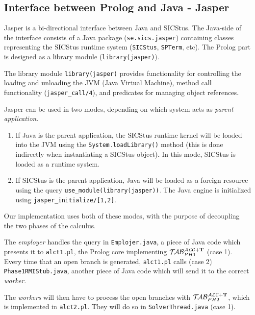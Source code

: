 \documentclass[a4paper, 11pt, oneside]{duthesis}
\newcommand{\tip}{{\bf T}}
\newcommand{\primo}{\mathrel{{\mathcal{T}\!\mathcal{AB}}}_{PH 1}^{\mathcal{ALC}+\mbox{\scriptsize $\tip$}}}
\newcommand{\secondo}{\mathrel{{\mathcal{T}\!\mathcal{AB}}}_{PH 2}^{\mathcal{ALC}+\mbox{\scriptsize $\tip$}}}
\begin{document}

\subsection{Interface between Prolog and Java - Jasper}\label{ssec_jasper}

Jasper is a bi-directional interface between Java and SICStus. The Java-side of the interface consists of a Java package (\verb$se.sics.jasper$) containing classes representing the SICStus runtime system (\verb$SICStus$, \verb$SPTerm$, etc). The Prolog part is designed as a library module (\verb$library(jasper)$).

The library module \verb$library(jasper)$  provides functionality for controlling the loading and unloading the JVM (Java Virtual Machine), method call functionality (\verb$jasper_call/4$), and predicates for managing object references.

Jasper can be used in two modes, depending on which system acts as \emph{parent application}.
\begin{enumerate}
\item If Java is the parent application, the SICStus runtime kernel will be loaded into the JVM using the \verb$System.loadLibrary()$ method (this is done indirectly when instantiating a SICStus object). In this mode, SICStus is loaded as a runtime system.

\item If SICStus is the parent application, Java will be loaded as a foreign resource using the query \verb$use_module(library(jasper))$. The Java engine is initialized using \verb$jasper_initialize/[1,2]$\cite{sicstus_jasper}.\\
\end{enumerate}

Our implementation uses both of these modes, with the purpose of decoupling the two phases of the calculus.

The \emph{employer} handles the query in \verb$Emplojer.java$, a piece of Java code which presents it to \verb$alct1.pl$, the Prolog core implementing $\primo$ (case 1). Every time that an open branch is generated, \verb$alct1.pl$ calls (case 2) \verb$Phase1RMIStub.java$, another piece of Java code which will send it to the correct \emph{worker}.

The \emph{workers} will then have to process the open branches with $\secondo$, which is implemented in \verb$alct2.pl$. They will do so in \verb$SolverThread.java$ (case 1).
\end{document}
